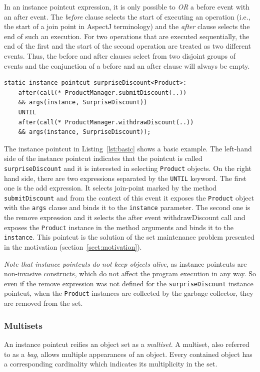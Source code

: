 \documentclass{acm_proc_article-sp}
\newtheorem{mydef}{Definition}
\newcommand{\lstinln}[1]{\lstinline~#1~}
\begin{document}
In an instance pointcut expression, it is only possible to \emph{OR} a before event with an after event. 
The \emph{before} clause selects the start of executing an operation (i.e., the start of a join point in AspectJ terminology) and the \emph{after} clause selects the end of such an execution. 
For two operations that are executed sequentially, the end of the first and the start of the second operation are treated as two different events. Thus, the before and after clauses select from two disjoint groups of events and the conjunction of a before and an after clause will always be empty.

\begin{lstlisting}[float=h!, caption={A basic instance pointcut declaration with add and remove expressions}, label={lst:basic}]
static instance pointcut surpriseDiscount<Product>: 
	after(call(* ProductManager.submitDiscount(..)) 
	&& args(instance, SurpriseDiscount)) 
	UNTIL 
	after(call(* ProductManager.withdrawDiscount(..)) 
	&& args(instance, SurpriseDiscount));
\end{lstlisting}

The instance pointcut in Listing~\ref{lst:basic} shows a basic example. The left-hand side of the instance pointcut indicates that the pointcut is called \lstinln{surpriseDiscount} and it is interested in selecting \lstinln{Product} objects. 
On the right hand side, there are two expressions separated by the \lstinln{UNTIL} keyword. The first one is the add expression. It selects join-point marked by the method \lstinln{submitDiscount} and from the context of this event it exposes the \lstinln{Product} object with the \lstinln{args} clause and binds it to the \lstinln{instance} parameter. 
The second one is the remove expression and it selects the after event \textsf{withdrawDiscount} call and exposes the \lstinln{Product} instance in the method arguments and binds it to the \lstinln{instance}.
This pointcut is the solution of the set maintenance problem presented in the motivation (section~\ref{sect:motivation}).
 

\emph{Note that instance pointcuts do not keep objects alive}, as instance pointcuts are non-invasive constructs, which do not affect the program execution in any way. So even if the remove expression was not defined for the \lstinln{surpriseDiscount} instance pointcut, when the \lstinln{Product} instances are collected by the garbage collector, they are removed from the set. 

\subsubsection{Multisets}
An instance pointcut reifies an object set as a \emph{multiset}. A multiset, also referred to as a \emph{bag}, allows multiple appearances of an object. Every contained object has a corresponding cardinality which indicates its multiplicity in the set.  
%
\end{document}
